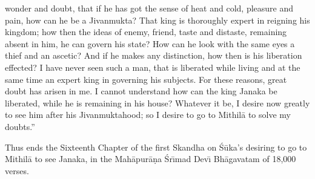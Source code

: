 wonder and doubt, that if he has got the sense of heat and cold, pleasure and pain, how can he be a Jivanmukta? That king is thoroughly expert in reigning his kingdom; how then the ideas of enemy, friend, taste and distaste, remaining absent in him, he can govern his state? How can he look with the same eyes a thief and an ascetic? And if he makes any distinction, how then is his liberation effected? I have never seen such a man, that is liberated while living and at the same time an expert king in governing his subjects. For these reasons, great doubt has arisen in me. I cannot understand how can the king Janaka be liberated, while he is remaining in his house? Whatever it be, I desire now greatly to see him after his Jivanmuktahood; so I desire to go to Mithil\=a to solve my doubts.''

Thus ends the Sixteenth Chapter of the first Skandha on \'S\=uka's desiring to go to Mithil\=a to see Janaka, in the Mah\=apur\=a\d{n}a \'Sr\={\i}mad Dev\={\i} Bh\=agavatam of 18,000 verses.



